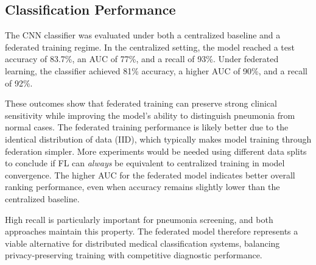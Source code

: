 \subsection{Classification Performance}

The CNN classifier was evaluated under both a centralized baseline and
a federated training regime. In the centralized setting, the model
reached a test accuracy of 83.7\%, an AUC of 77\%, and a recall of
93\%. Under federated learning, the classifier achieved 81\% accuracy,
a higher AUC of 90\%, and a recall of 92\%.

These outcomes show that federated training can preserve strong
clinical sensitivity while improving the model's ability to
distinguish pneumonia from normal cases. The federated training
performance is likely better due to the identical distribution of data
(IID), which typically makes model training through federation
simpler. More experiments would be needed using different data splits
to conclude if FL can \textit{always} be equivalent to centralized
training in model convergence. The higher AUC for the
federated model indicates better overall ranking performance, even
when accuracy remains slightly lower than the centralized baseline.

High recall is particularly important for pneumonia screening, and
both approaches maintain this property. The federated model therefore
represents a viable alternative for distributed medical classification
systems, balancing privacy-preserving training with competitive
diagnostic performance.
